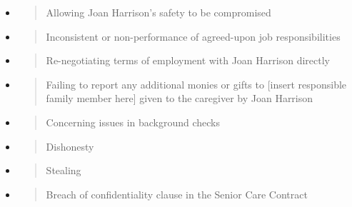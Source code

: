 \documentclass[]{article}
\begin{document}
\begin{itemize}
\item
  \begin{quote}
  Allowing Joan Harrison's safety to be compromised
  \end{quote}
\end{itemize}

\begin{itemize}
\item
  \begin{quote}
  Inconsistent or non-performance of agreed-upon job responsibilities
  \end{quote}
\end{itemize}

\begin{itemize}
\item
  \begin{quote}
  Re-negotiating terms of employment with Joan Harrison directly
  \end{quote}
\end{itemize}

\begin{itemize}
\item
  \begin{quote}
  Failing to report any additional monies or gifts to {[}insert
  responsible family member here{]} given to the caregiver by Joan
  Harrison
  \end{quote}
\end{itemize}

\begin{itemize}
\item
  \begin{quote}
  Concerning issues in background checks
  \end{quote}
\end{itemize}

\begin{itemize}
\item
  \begin{quote}
  Dishonesty
  \end{quote}
\end{itemize}

\begin{itemize}
\item
  \begin{quote}
  Stealing
  \end{quote}
\end{itemize}

\begin{itemize}
\item
  \begin{quote}
  Breach of confidentiality clause in the Senior Care Contract
  \end{quote}
\end{itemize}
\end{document}
